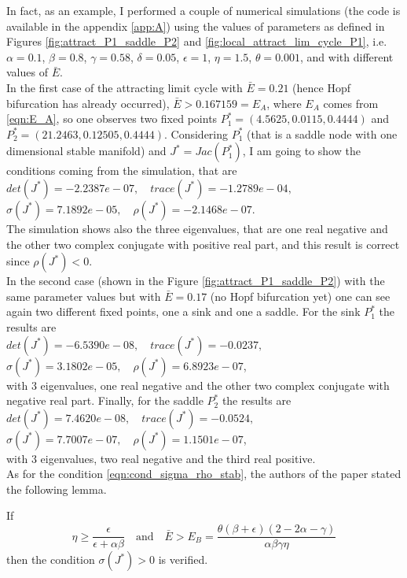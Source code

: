 In fact, as an example, I performed a couple of numerical simulations (the code is available in the appendix \ref{app:A}) using the values of parameters as defined in Figures \ref{fig:attract_P1_saddle_P2} and \ref{fig:local_attract_lim_cycle_P1}, i.e. $\alpha=0.1$, $\beta=0.8$, $\gamma=0.58$, $\delta=0.05$, $\epsilon=1$, $\eta=1.5$, $\theta=0.001$, and with different values of $\bar{E}$.\\
In the first case of the attracting limit cycle with $\bar{E}=0.21$ (hence Hopf bifurcation has already occurred), $\bar{E}>0.167159=E_A$, where $E_A$ comes from \eqref{eqn:E_A}, so one observes two fixed points $P_1^*=(4.5625,0.0115,0.4444)$ and $P_2^*=(21.2463,0.12505,0.4444)$. Considering $P_1^*$ (that is a saddle node with one dimensional stable manifold) and $J^*=Jac(P_1^*)$, I am going to show the conditions coming from the simulation, that are \\$det(J^*)=-2.2387e-07,\quad trace(J^*)=-1.2789e-04,$\\ $\sigma(J^*)=7.1892e-05,\quad \rho(J^*)=-2.1468e-07$. \\
The simulation shows also the three eigenvalues, that are one real negative and the other two complex conjugate with positive real part, and this result is correct since $\rho(J^*)<0$.\\
In the second case (shown in the Figure \ref{fig:attract_P1_saddle_P2}) with the same parameter values but with $\bar{E}=0.17$ (no Hopf bifurcation yet) one can see again two different fixed points, one a sink and one a saddle. For the sink $P_1^*$ the results are\\ $det(J^*)=-6.5390e-08,\quad trace(J^*)=-0.0237,$\\ $\sigma(J^*)=3.1802e-05,\quad \rho(J^*)=6.8923e-07$,\\ 
with 3 eigenvalues, one real negative and the other two complex conjugate with negative real part. Finally, for the saddle $P_2^*$ the results are\\ $det(J^*)=7.4620e-08,\quad trace(J^*)=-0.0524,$\\ $\sigma(J^*)=7.7007e-07,\quad \rho(J^*)=1.1501e-07$,\\ 
with 3 eigenvalues, two real negative and the third real positive. \\
As for the condition \eqref{eqn:cond_sigma_rho_stab}, the authors of the paper stated the following lemma.
\begin{lemma} \label{lemma:3_condition_for_simga_pos}
	If 
	\begin{equation} \label{eqn:lemma_3}
		\eta\geq \frac{\epsilon}{\epsilon+\alpha\beta} \quad \text{and} \quad \bar{E}>E_B=\frac{\theta(\beta+\epsilon)(2-2\alpha-\gamma)}{\alpha\beta\gamma\eta}
	\end{equation}
	then the condition $\sigma(J^*)>0$ is verified.
\end{lemma}
